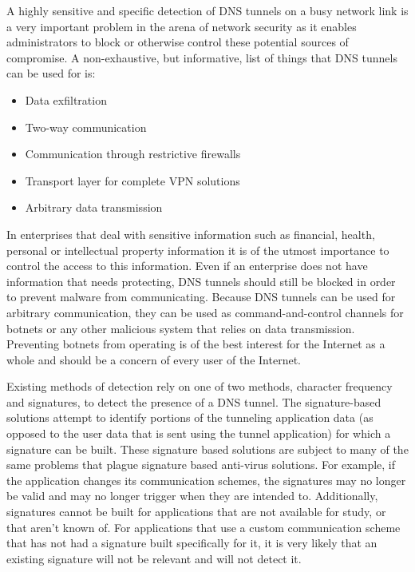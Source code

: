 \documentclass[12pt]{article}
\theoremstyle{remark}
\theoremstyle{definition}
\theoremstyle{definition}
\theoremstyle{definition}
\begin{document}
A highly sensitive and specific detection of DNS tunnels on a busy network link
is a very important problem in the arena of network security as it enables
administrators to block or otherwise control these potential sources of
compromise. A non-exhaustive, but informative, list of things that DNS tunnels
can be used for is:

\begin{itemize}
\item Data exfiltration
\item Two-way communication
\item Communication through restrictive firewalls
\item Transport layer for complete VPN solutions
\item Arbitrary data transmission
\end{itemize}

In enterprises that deal with sensitive information such as financial, health,
personal or intellectual property information it is of the utmost importance to
control the access to this information. Even if an enterprise does not have
information that needs protecting, DNS tunnels should still be blocked in order
to prevent malware from communicating. Because DNS tunnels can be used for
arbitrary communication, they can be used as command-and-control channels for
botnets or any other malicious system that relies on data transmission. Preventing
botnets from operating is of the best interest for the Internet as a whole and
should be a concern of every user of the Internet.

Existing methods of detection rely on one of two methods, character frequency
and signatures, to detect the presence of a DNS tunnel. The signature-based solutions attempt to identify portions of the tunneling
application data (as opposed to the user data that is sent using the tunnel
application) for which a signature can be built. These signature based
solutions are subject to many of the same problems that plague signature based
anti-virus solutions. For example, if the application changes its communication
schemes, the signatures may no longer be valid and may no longer trigger when
they are intended to. Additionally, signatures cannot be built for applications
that are not available for study, or that aren't known of. For applications
that use a custom communication scheme that has not had a signature built
specifically for it, it is very likely that an existing signature will not be
relevant and will not detect it.
\end{document}
